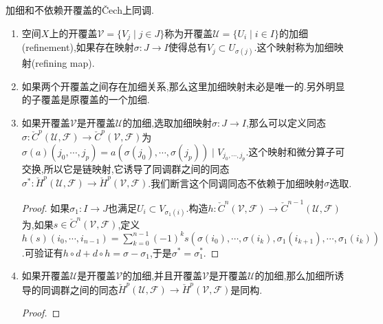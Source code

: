 加细和不依赖开覆盖的\v{C}ech上同调.
\begin{enumerate}
	\item 空间$X$上的开覆盖$\mathscr{V}=\{V_j\mid j\in J\}$称为开覆盖$\mathscr{U}=\{U_i\mid i\in I\}$的加细(refinement),如果存在映射$\sigma:J\to I$使得总有$V_j\subset U_{\sigma(j)}$.这个映射称为加细映射(refining map).
	\item 如果两个开覆盖之间存在加细关系,那么这里加细映射未必是唯一的.另外明显的子覆盖是原覆盖的一个加细.
	\item 如果开覆盖$\mathscr{V}$是开覆盖$\mathscr{U}$的加细,选取加细映射$\sigma:J\to I$,那么可以定义同态$\sigma:\check{C}^p(\mathscr{U},\mathscr{F})\to\check{C}^p(\mathscr{V},\mathscr{F})$为$\sigma(a)(j_0,\cdots,j_p)=a(\sigma(j_0),\cdots,\sigma(j_p))\mid V_{j_0,\cdots,j_p}$.这个映射和微分算子可交换,所以它是链映射,它诱导了同调群之间的同态$\sigma^*:\check{H}^p(\mathscr{U},\mathscr{F})\to\check{H}^p(\mathscr{V},\mathscr{F})$.我们断言这个同调同态不依赖于加细映射$\sigma$选取.
	\begin{proof}
		
		如果$\sigma_1:I\to J$也满足$U_i\subset V_{\sigma_1(i)}$.构造$h:\check{C}^n(\mathscr{V},\mathscr{F})\to\check{C}^{n-1}(\mathscr{U},\mathscr{F})$为,如果$s\in\check{C}^n(\mathscr{V},\mathscr{F})$,定义$h(s)(i_0,\cdots,i_{n-1})=\sum_{k=0}^{n-1}(-1)^ks(\sigma(i_0),\cdots,\sigma(i_k),\sigma_1(i_{k+1}),\cdots,\sigma_1(i_k))$.可验证有$h\circ d+d\circ h=\sigma-\sigma_1$,于是$\sigma^*=\sigma^*_1$.
	\end{proof}
	\item 如果开覆盖$\mathscr{U}$是开覆盖$\mathscr{V}$的加细,并且开覆盖$\mathscr{V}$是开覆盖$\mathscr{U}$的加细,那么加细所诱导的同调群之间的同态$\check{H}^p(\mathscr{U},\mathscr{F})\to\check{H}^p(\mathscr{V},\mathscr{F})$是同构.
	\begin{proof}
		

\end{proof}
\end{enumerate}
